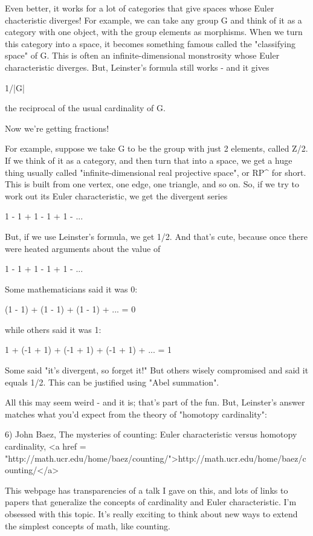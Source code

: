 Even better, it works for a lot of categories that give spaces whose
Euler chacteristic diverges!  For example, we can take any group G and
think of it as a category with one object, with the group elements as
morphisms.  When we turn this category into a space, it becomes
something famous called the "classifying space" of G.  This
is often an infinite-dimensional monstrosity whose Euler
characteristic diverges.  But, Leinster's formula still works - and it
gives

1/|G|

the reciprocal of the usual cardinality of G.  

Now we're getting fractions!  

For example, suppose we take G to be the group with just 2 elements,
called Z/2.  If we think of it as a category, and then turn that into
a space, we get a huge thing usually called "infinite-dimensional
real projective space", or RP^{\infty } for short.  This
is built from one vertex, one edge, one triangle, and so on.  So, if
we try to work out its Euler characteristic, we get the divergent
series

1 - 1 + 1 - 1 + 1 - ...

But, if we use Leinster's formula, we get 1/2.  And that's cute, because 
once there were heated arguments about the value of 

1 - 1 + 1 - 1 + 1 - ...

Some mathematicians said it was 0:

(1 - 1) + (1 - 1) + (1 - 1) + ... = 0

while others said it was 1:

1 + (-1 + 1) + (-1 + 1) + (-1 + 1) + ... = 1

Some said "it's divergent, so forget it!" But others wisely
compromised and said it equals 1/2.  This can be justified using
"Abel summation".

All this may seem weird - and it is; that's part of the fun.  But,
Leinster's answer matches what you'd expect from the theory of
"homotopy cardinality":

6) John Baez, The mysteries of counting: Euler characteristic versus
homotopy cardinality, <a href = "http://math.ucr.edu/home/baez/counting/">http://math.ucr.edu/home/baez/counting/</a>

This webpage has transparencies of a talk I gave on this, and lots of 
links to papers that generalize the concepts of cardinality and Euler
characteristic.  I'm obsessed with this topic.  It's really exciting 
to think about new ways to extend the simplest concepts of math, like 
counting.  

